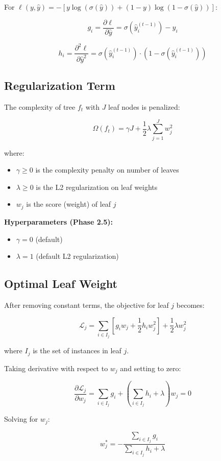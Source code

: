 \documentclass[12pt,a4paper]{article}
\begin{document}
For $\ell(y, \hat{y}) = -[y \log(\sigma(\hat{y})) + (1-y) \log(1 - \sigma(\hat{y}))]$:

$$g_i = \frac{\partial \ell}{\partial \hat{y}} = \sigma(\hat{y}_i^{(t-1)}) - y_i$$

$$h_i = \frac{\partial^2 \ell}{\partial \hat{y}^2} = \sigma(\hat{y}_i^{(t-1)}) \cdot (1 - \sigma(\hat{y}_i^{(t-1)}))$$

\subsection{Regularization Term}

The complexity of tree $f_t$ with $J$ leaf nodes is penalized:

$$\Omega(f_t) = \gamma J + \frac{1}{2} \lambda \sum_{j=1}^{J} w_j^2$$

where:
\begin{itemize}
    \item $\gamma \geq 0$ is the complexity penalty on number of leaves
    \item $\lambda \geq 0$ is the L2 regularization on leaf weights
    \item $w_j$ is the score (weight) of leaf $j$
\end{itemize}

\textbf{Hyperparameters (Phase 2.5):}
\begin{itemize}
    \item $\gamma = 0$ (default)
    \item $\lambda = 1$ (default L2 regularization)
\end{itemize}

\subsection{Optimal Leaf Weight}

After removing constant terms, the objective for leaf $j$ becomes:

$$\mathcal{L}_j = \sum_{i \in I_j} [g_i w_j + \frac{1}{2} h_i w_j^2] + \frac{1}{2} \lambda w_j^2$$

where $I_j$ is the set of instances in leaf $j$.

Taking derivative with respect to $w_j$ and setting to zero:

$$\frac{\partial \mathcal{L}_j}{\partial w_j} = \sum_{i \in I_j} g_i + \left(\sum_{i \in I_j} h_i + \lambda\right) w_j = 0$$

Solving for $w_j$:

$$w_j^* = -\frac{\sum_{i \in I_j} g_i}{\sum_{i \in I_j} h_i + \lambda}$$
\end{document}
